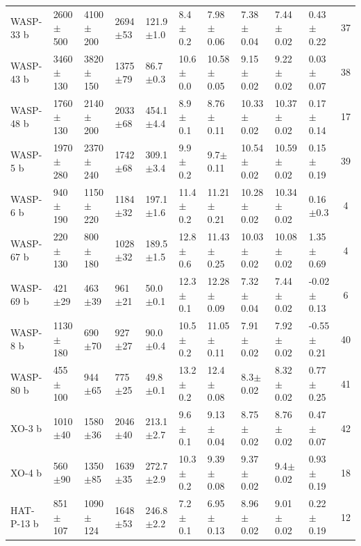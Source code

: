 \begin{subappendices}
{\begin{landscape}
\begin{longtable}{llllllllllc}
  WASP-33 b   &    2600$\pm$500 &    4100$\pm$200 &   2694$\pm$53 &    121.9$\pm$1.0 &   8.4$\pm$0.2 &   7.98$\pm$0.06 &   7.38$\pm$0.04 &   7.44$\pm$0.02 &   0.43$\pm$0.22 &       37 \\
  WASP-43 b   &    3460$\pm$130 &    3820$\pm$150 &   1375$\pm$79 &     86.7$\pm$0.3 &  10.6$\pm$0.0 &  10.58$\pm$0.05 &   9.15$\pm$0.02 &   9.22$\pm$0.02 &   0.03$\pm$0.07 &       38 \\
  WASP-48 b   &    1760$\pm$130 &    2140$\pm$200 &   2033$\pm$68 &    454.1$\pm$4.4 &   8.9$\pm$0.1 &   8.76$\pm$0.11 &  10.33$\pm$0.02 &  10.37$\pm$0.02 &   0.17$\pm$0.14 &       17 \\
  WASP-5 b    &    1970$\pm$280 &    2370$\pm$240 &   1742$\pm$68 &    309.1$\pm$3.4 &   9.9$\pm$0.2 &    9.7$\pm$0.11 &  10.54$\pm$0.02 &  10.59$\pm$0.02 &   0.15$\pm$0.19 &       39 \\
  WASP-6 b    &     940$\pm$190 &    1150$\pm$220 &   1184$\pm$32 &    197.1$\pm$1.6 &  11.4$\pm$0.2 &  11.21$\pm$0.21 &  10.28$\pm$0.02 &  10.34$\pm$0.02 &    0.16$\pm$0.3 &        4 \\
  WASP-67 b   &     220$\pm$130 &     800$\pm$180 &   1028$\pm$32 &    189.5$\pm$1.5 &  12.8$\pm$0.6 &  11.43$\pm$0.25 &  10.03$\pm$0.02 &  10.08$\pm$0.02 &   1.35$\pm$0.69 &        4 \\
  WASP-69 b   &      421$\pm$29 &      463$\pm$39 &    961$\pm$21 &     50.0$\pm$0.1 &  12.3$\pm$0.1 &  12.28$\pm$0.09 &   7.32$\pm$0.04 &   7.44$\pm$0.02 &  -0.02$\pm$0.13 &        6 \\
  WASP-8 b    &    1130$\pm$180 &      690$\pm$70 &    927$\pm$27 &     90.0$\pm$0.4 &  10.5$\pm$0.2 &  11.05$\pm$0.11 &   7.91$\pm$0.02 &   7.92$\pm$0.02 &  -0.55$\pm$0.21 &       40 \\
  WASP-80 b   &     455$\pm$100 &      944$\pm$65 &    775$\pm$25 &     49.8$\pm$0.1 &  13.2$\pm$0.2 &   12.4$\pm$0.08 &    8.3$\pm$0.02 &   8.32$\pm$0.02 &   0.77$\pm$0.25 &       41 \\
  XO-3 b      &     1010$\pm$40 &     1580$\pm$36 &   2046$\pm$40 &    213.1$\pm$2.7 &   9.6$\pm$0.1 &   9.13$\pm$0.04 &   8.75$\pm$0.02 &   8.76$\pm$0.02 &   0.47$\pm$0.07 &       42 \\
  XO-4 b      &      560$\pm$90 &     1350$\pm$85 &   1639$\pm$35 &    272.7$\pm$2.9 &  10.3$\pm$0.2 &   9.39$\pm$0.08 &   9.37$\pm$0.02 &    9.4$\pm$0.02 &   0.93$\pm$0.19 &       18 \\
  HAT-P-13 b  &     851$\pm$107 &    1090$\pm$124 &   1648$\pm$53 &    246.8$\pm$2.2 &   7.2$\pm$0.1 &   6.95$\pm$0.13 &   8.96$\pm$0.02 &   9.01$\pm$0.02 &   0.22$\pm$0.19 &       12 \\

\end{longtable}
\end{landscape}}
\end{subappendices}
